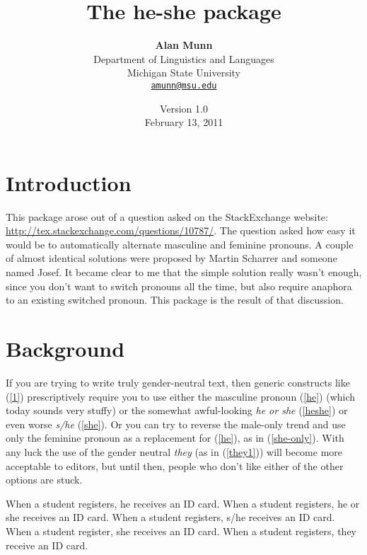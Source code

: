 \documentclass[11pt]{article}
\title{\textbf{The \textsf{he-she} package}}
\author{\textbf{Alan Munn}\\Department of Linguistics and Languages\\Michigan State University\\\texttt{\href{mailto:amunn@msu.edu}{amunn@msu.edu}}}
\date{Version 1.0\\February 13, 2011}
\begin{document}
\maketitle
\thispagestyle{empty}
\renewcommand{\abstractname}{\sffamily Abstract}

\section{Introduction}
This package arose out of a question asked on the StackExchange website: \url{http://tex.stackexchange.com/questions/10787/}. The question asked how easy it would be to automatically alternate masculine and feminine pronouns. A couple of almost identical solutions were proposed by Martin Scharrer and someone named Josef.  It became clear to me that the simple solution really wasn't enough, since you don't want to switch pronouns all the time, but also require anaphora to an existing switched pronoun.  This package is the result of that discussion. 
\section{Background}
If you are trying to write truly gender-neutral text, then generic constructs like (\ref{1}) prescriptively require you to use either the masculine pronoun (\ref{he}) (which today sounds very stuffy) or the somewhat awful-looking \emph{he or she} (\ref{heshe}) or even worse \emph{s/he} (\ref{she}). Or you can try to reverse the male-only trend and use only the feminine pronoun as a replacement for (\ref{he}), as in (\ref{she-only}). With any luck the use of the gender neutral \emph{they} (as in (\ref{they1})) will become more acceptable to editors, but until then, people who don't like either of the other options are stuck.

\begin{exe}
\ex\label{1}
\begin{xlist}
\ex When a student registers, he receives an ID card.\label{he}
\ex When a student registers, he or she receives an ID card.\label{heshe}
\ex When a student registers, s/he receives an ID card.\label{she}
\ex When a student register, she receives an ID card.\label{she-only}
\ex When a student registers, they receive an ID card.\label{they1}
\end{xlist}
\end{exe}
\end{document}
